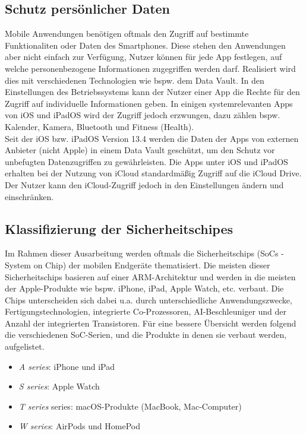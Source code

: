 \subsection{Schutz persönlicher Daten}
Mobile Anwendungen benötigen oftmals den Zugriff auf bestimmte Funktionaliten oder Daten des Smartphones.
Diese stehen den Anwendungen aber nicht einfach zur Verfügung, Nutzer können für jede App festlegen, auf 
welche personenbezogene Informationen zugegriffen werden darf. Realisiert wird dies mit verschiedenen Technologien 
wie bspw. dem Data Vault. In den Einstellungen des Betriebssystems kann der Nutzer einer App die Rechte für den Zugriff 
auf individuelle Informationen geben. In einigen systemrelevanten Apps von iOS und iPadOS wird der Zugriff jedoch erzwungen, 
dazu zählen bspw. Kalender, Kamera, Bluetooth und Fitness (Health). \\ 

Seit der iOS bzw. iPadOS Version 13.4 werden die Daten der Apps von externen Anbieter (nicht Apple) in einem Data Vault geschützt, 
um den Schutz vor unbefugten Datenzugriffen zu gewährleisten. Die Apps unter iOS und iPadOS erhalten bei der Nutzung von iCloud 
standardmäßig Zugriff auf die iCloud Drive. Der Nutzer kann den iCloud-Zugriff jedoch in den Einstellungen ändern und einschränken. 

\subsection{Klassifizierung der Sicherheitschipes}
Im Rahmen dieser Ausarbeitung werden oftmals die Sicherheitschips (SoCs - System on Chip) der mobilen Endgeräte thematisiert. 
Die meisten dieser Sicherheitschips basieren auf einer ARM-Architektur und werden in die meisten der Apple-Produkte wie bspw.
iPhone, iPad, Apple Watch, etc. verbaut. Die Chips unterscheiden sich dabei u.a. durch unterschiedliche Anwendungszwecke, 
Fertigungstechnologien, integrierte Co-Prozessoren, AI-Beschleuniger und der Anzahl der integrierten Transistoren. Für eine 
bessere Übersicht werden folgend die verschiedenen SoC-Serien, und die Produkte in denen sie verbaut werden, aufgelistet.

\begin{itemize}
\item \textit{A series}: iPhone und iPad
\item \textit{S series}: Apple Watch
\item \textit{T series} series: macOS-Produkte (MacBook, Mac-Computer)
\item \textit{W series}: AirPods und HomePod
\end{itemize}



